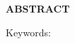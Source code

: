 
\begin{center}

    {\bfseries ABSTRACT }
    \vspace{1\baselineskip}

\end{center}

    \abstract

    \vspace{1\baselineskip}
    \noindent Keywords: \textit{\keywords}

\clearpage{}